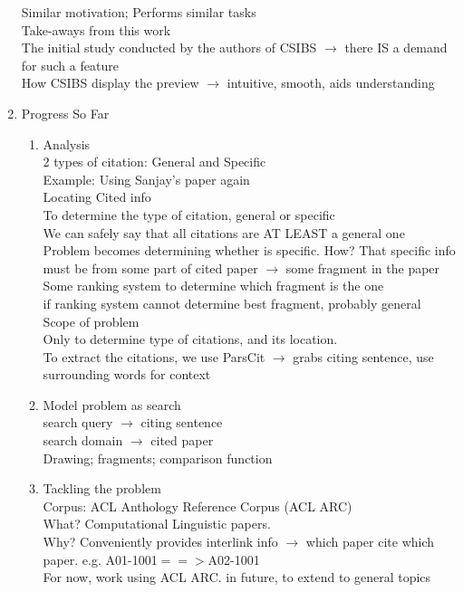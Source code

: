 \documentclass[12 pt]{article}
\begin{document}
\begin{enumerate}
Similar motivation; Performs similar tasks\\
Take-aways from this work\\
The initial study conducted by the authors of CSIBS $\rightarrow$ there IS a demand for such a feature\\
How CSIBS display the preview $\rightarrow$ intuitive, smooth, aids understanding
\item Progress So Far
\begin{enumerate}
\item Analysis\\
2 types of citation: General and Specific\\
Example: Using Sanjay's paper again\\
Locating Cited info\\
To determine the type of citation, general or specific\\
We can safely say that all citations are AT LEAST a general one\\
Problem becomes determining whether is specific. How? That specific info must be from some part of cited paper $\rightarrow$ some fragment in the paper\\
Some ranking system to determine which fragment is the one\\
if ranking system cannot determine best fragment, probably general
Scope of problem\\
Only to determine type of citations, and its location.\\
To extract the citations, we use ParsCit $\rightarrow$ grabs citing sentence, use surrounding words for context

\item Model problem as search\\
search query $\rightarrow$ citing sentence\\
search domain $\rightarrow$ cited paper\\
Drawing; fragments; comparison function

\item Tackling the problem\\
Corpus: ACL Anthology Reference Corpus (ACL ARC)\\
What? Computational Linguistic papers.\\
Why? Conveniently provides interlink info $\rightarrow$ which paper cite which paper. e.g. A01-1001$==>$A02-1001\\
For now, work using ACL ARC. in future, to extend to general topics


\end{enumerate}
\end{enumerate}
\end{document}
